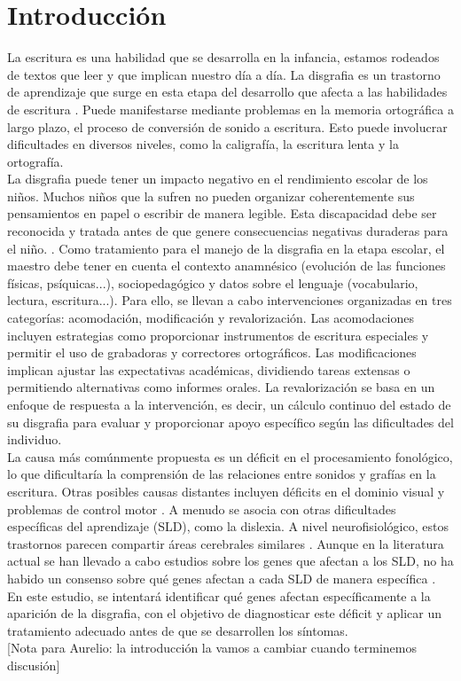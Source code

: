 \section{Introducción}
La escritura es una habilidad que se desarrolla en la infancia, estamos rodeados de textos que leer y que implican nuestro día a día. La disgrafia es un trastorno de aprendizaje que surge en esta etapa del desarrollo que afecta a las habilidades de escritura \cite{Chung2015}. Puede manifestarse mediante problemas en la memoria ortográfica a largo plazo, el proceso de conversión de sonido a escritura. Esto puede involucrar dificultades en diversos niveles, como la caligrafía, la escritura lenta y la ortografía.\\


La disgrafia puede tener un impacto negativo en el rendimiento escolar de los niños. Muchos niños que la sufren no pueden organizar coherentemente sus pensamientos en papel o escribir de manera legible. Esta discapacidad debe ser reconocida y tratada antes de que genere consecuencias negativas duraderas para el niño. \cite{Crouch2007}. Como tratamiento para el manejo de la disgrafia en la etapa escolar, el maestro debe tener en cuenta el contexto anamnésico (evolución de las funciones físicas, psíquicas...), sociopedagógico y datos sobre el lenguaje (vocabulario, lectura, escritura...)\cite{Santana}. Para ello, se llevan a cabo intervenciones organizadas en tres categorías: acomodación, modificación y revalorización\cite{Chung2015}. Las acomodaciones incluyen estrategias como proporcionar instrumentos de escritura especiales y permitir el uso de grabadoras y correctores ortográficos. Las modificaciones implican ajustar las expectativas académicas, dividiendo tareas extensas o permitiendo alternativas como informes orales. La revalorización se basa en un enfoque de respuesta a la intervención, es decir, un cálculo continuo del estado de su disgrafia para evaluar y proporcionar apoyo específico según las dificultades del individuo.\\


La causa más comúnmente propuesta es un déficit en el procesamiento fonológico, lo que dificultaría la comprensión de las relaciones entre sonidos y grafías en la escritura. Otras posibles causas distantes incluyen déficits en el dominio visual y problemas de control motor \cite{McCloskey2017}. A menudo se asocia con otras dificultades específicas del aprendizaje (SLD), como la dislexia. A nivel neurofisiológico, estos trastornos parecen compartir áreas cerebrales similares \cite{Marek2020, Nicolson2011}. Aunque en la literatura actual se han llevado a cabo estudios sobre los genes que afectan a los SLD, no ha habido un consenso sobre qué genes afectan a cada SLD de manera específica \cite{Abbott2017, Berninger2010}. En este estudio, se intentará identificar qué genes afectan específicamente a la aparición de la disgrafia, con el objetivo de diagnosticar este déficit y aplicar un tratamiento adecuado antes de que se desarrollen los síntomas. \\

[Nota para Aurelio: la introducción la vamos a cambiar cuando terminemos discusión]